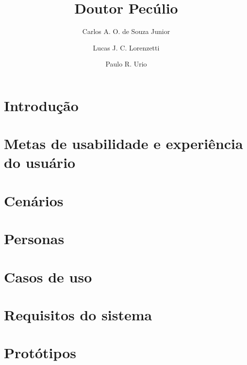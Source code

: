 \documentclass[12pt,a4paper]{article}
\title{Doutor Pecúlio}
\author{Carlos A. O. de Souza Junior\inst{1}
	\and Lucas J. C. Lorenzetti\inst{1} 
	\and Paulo R. Urio\inst{1}}
\begin{document}
\maketitle
\thispagestyle{fancy}


\section{Introdução}

\FloatBarrier
\section{Metas de usabilidade e experiência do usuário}

\FloatBarrier
\section{Cenários}

\FloatBarrier
\section{Personas}

\section{Casos de uso}

\FloatBarrier
\section{Requisitos do sistema}

\section{Protótipos}
\end{document}
